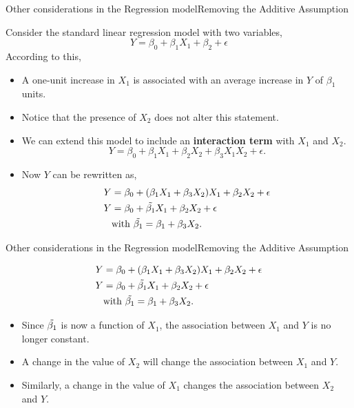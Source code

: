 \begin{frame}{Other considerations in the Regression model}{Removing the Additive Assumption}

Consider the standard linear regression model with two variables, 
        $$Y = \beta_0 + \beta_1 X_1 + \beta_2 + \epsilon$$
According to this, \pause
\begin{itemize}
    \item A one-unit increase in $X_1$ is associated with an average increase in $Y$ of $\beta_1$ units. \pause
    \item Notice that the presence of $X_2$ does not alter this statement. \pause
    \item We can extend this model to include an \textbf{interaction term} with $X_1$ and $X_2$. \pause 
    \begin{equation*}
        Y = \beta_0 + \beta_1 X_1 + \beta_2 X_2 + \beta_3 X_1 X_2 + \epsilon.
    \end{equation*}
    \item \pause Now $Y$ can be rewritten as, 
    \begin{align*}
        Y &=   \beta_0 + (\beta_1 X_1 + \beta_3 X_2)X_1 + \beta_2 X_2 + \epsilon \\
        Y &=   \beta_0 + \Tilde{\beta_1}X_1 + \beta_2 X_2 + \epsilon \\
        & \text{with } \Tilde{\beta_1} = \beta_1 + \beta_3 X_2. 
    \end{align*} 
\end{itemize}
    
\end{frame}

\begin{frame}{Other considerations in the Regression model}{Removing the Additive Assumption}

    \begin{align*}
        Y &=   \beta_0 + (\beta_1 X_1 + \beta_3 X_2)X_1 + \beta_2 X_2 + \epsilon \\
        Y &=   \beta_0 + \Tilde{\beta_1}X_1 + \beta_2 X_2 + \epsilon \\
         & \text{with } \Tilde{\beta_1} = \beta_1 + \beta_3 X_2.
    \end{align*}

\begin{itemize}
    \item Since $\Tilde{\beta_1}$ is now a function of $X_1$, the association between $X_1$ and $Y$ is no longer constant. \pause
    \item A change in the value of $X_2$ will change the association between $X_1$ and $Y$. \pause
    \item Similarly, a change in the value of $X_1$ changes the association between $X_2$ and $Y$.\pause
\end{itemize}
\end{frame}


